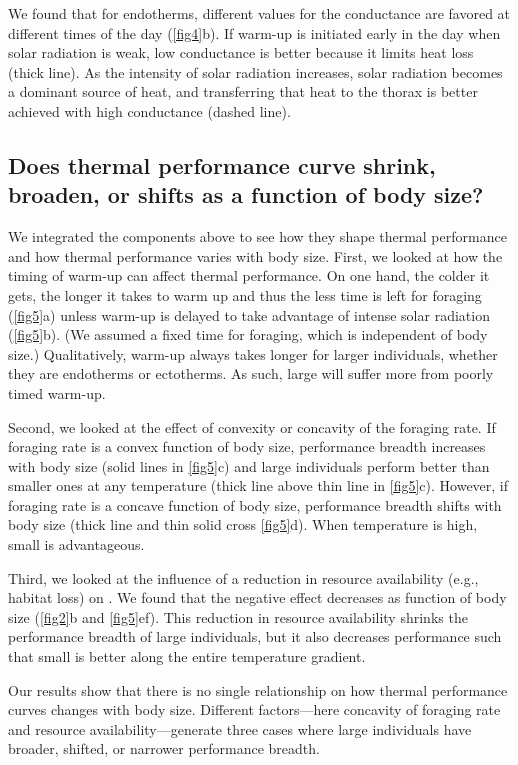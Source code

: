 We found that for endotherms, different values for the conductance are favored at different times of the day (\cref{fig4}b).
If warm-up is initiated early in the day when solar radiation is weak, low conductance is better because it limits heat loss (thick line).
As the intensity of solar radiation increases, solar radiation becomes a dominant source of heat, and transferring that heat to the thorax is better achieved with high conductance (dashed line).

\subsection*{Does thermal performance curve shrink, broaden, or shifts as a function of body size?}
We integrated the components above to see how they shape thermal performance and how thermal performance varies with body size.
First, we looked at how the timing of warm-up can affect thermal performance.
On one hand, the colder it gets, the longer it takes to warm up and thus the less time is left for foraging (\cref{fig5}a) unless warm-up is delayed to take advantage of intense solar radiation (\cref{fig5}b).
(We assumed a fixed time for foraging, which is independent of body size.)
Qualitatively, warm-up always takes longer for larger individuals, whether they are endotherms or ectotherms.
As such, large will suffer more from poorly timed warm-up.

Second, we looked at the effect of convexity or concavity of the foraging rate.
If foraging rate is a convex function of body size, performance breadth increases with body size (solid lines in \cref{fig5}c) and large individuals perform better than smaller ones at any temperature (thick line above thin line in \cref{fig5}c).
However, if foraging rate is a concave function of body size, performance breadth shifts with body size (thick line and thin solid cross \cref{fig5}d).
When temperature is high, small is advantageous.

Third, we looked at the influence of a reduction in resource availability (e.g., habitat loss) on .
We found that the negative effect decreases as function of body size (\cref{fig2}b and \cref{fig5}ef).
This reduction in resource availability shrinks the performance breadth of large individuals, but it also decreases performance such that small is better along the entire temperature gradient.


Our results show that there is no single relationship on how thermal performance curves changes with body size.
Different factors---here concavity of foraging  rate and resource availability---generate three cases where large individuals have broader, shifted, or narrower performance breadth.
